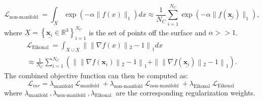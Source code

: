 \begin{equation}\label{non_manifold_sdf}
    \mathcal{L}_{\text {non-manifold }}=\int_{\underline{X}} \exp \left(-\alpha\|f(x)\|_{1}\right) d x \approx \frac{1}{N_C}\sum_{i=1}^{N_C} \exp \left(-\alpha\|f(\underline{\mathbf{x}_i})\|_1\right),
\end{equation}
where $\underline{X}=\left\{\underline{\mathbf{x}_i} \in \mathbb{R}^{3}\right\}_{i=1}^{N_C}$ is the set of points off the surface and $\alpha>>1$.
\begin{equation}\label{Eikonal}
     \begin{aligned}
         \mathcal{L}_{\text {Eikonal }}=\int_{X \cup \underline{X}} \| \| \nabla f(x)\left\|_{2}-1\right\|_{1} d x \\
         \approx \frac{1}{N_C}\sum_{i=1}^{N_C} \left(\| \| \nabla f(\mathbf{x}_i)\left\|_{2}-1\right\|_{1} + \| \| \nabla f(\underline{\mathbf{x}_i})\left\|_{2}-1\right\|_{1} \right).
     \end{aligned}
\end{equation}
The combined objective function can then be computed as:
\begin{equation}\label{inr_loss1}
    \mathcal{L}_{inr}= \lambda_{\text {manifold }} \mathcal{L}_{\text {manifold }}+\lambda_{\text {non-manifold }} \mathcal{L}_{\text {non-manifold }}+ \lambda_{\text {Eikonal }} \mathcal{L}_{\text {Eikonal }}
\end{equation}
where $\lambda_{\text {manifold }}, \lambda_{\text {non-manifold }}, \lambda_{\text {Eikonal }}$ are the corresponding regularization weights.
\newline

